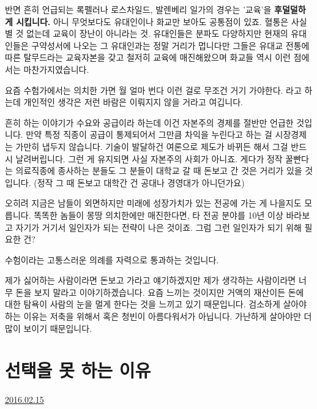 반면 흔히 언급되는 록펠러나 로스차일드, 발렌베리 일가의 경우는 '교육'을 \textbf{후덜덜하게 시킵니다.}
아니 무엇보다도 유대인이나 화교만 보아도 공통점이 있죠. 혈통은 사실 별 것 없는데 교육이 장난이 아니라는 것.
유대인들은 분파도 다양하지만 현재의 유대인들은 구약성서에 나오는 그 유대인과는 정말 거리가 멉니다만
그들은 유대교 전통에 따른 탈무드라는 교육자본을 갖고 철저히 교육에 매진해왔으며
화교들 역시 이런 점에서는 마찬가지였습니다.
\vspace{5mm}

요즘 수험가에서는 의치한 가면 월 얼마 번다 이런 걸로 무조건 거기 가야한다.
라고 하는데 개인적인 생각은 저런 바람은 이뤄지지 않을 거라고 여깁니다.
\vspace{5mm}

흔히 하는 이야기가 수요와 공급이라 하는데 이건 자본주의 경제를 절반만 언급한 것입니다.
만약 특정 직종이 공급이 통제되어서 그만큼 차익을 누린다고 하는 걸 시장경제는 가만히 냅두지 않습니다.
기술이 발달하건 여론으로 제도가 바뀌든 해서 그걸 반드시 날려버립니다. 그런 게 유지되면 사실 자본주의 사회가 아니죠.
게다가 정작 꿀빤다는 의료직종에 종사하는 분들도 그 분들이 대학교 갈 때 돈보고 간 것은 거리가 있을 것입니다.
(정작 그 때 돈보고 대학간 건 공대나 경영대가 아니던가요)
\vspace{5mm}

오히려 지금은 남들이 외면하지만 미래에 성장가치가 있는 전공에 가는 게 나을지도 모릅니다.
똑똑한 놈들이 몽땅 의치한에만 매진한다면, 타 전공 분야를 10년 이상 바라보고 자기가 거기서 일인자가 되는 전략이 나은 것이죠.
그럼 그런 일인자가 되기 위해 필요한 건?
\vspace{5mm}

수험이라는 고통스러운 의례를 자력으로 통과하는 것입니다.
\vspace{5mm}

제가 싫어하는 사람이라면 돈보고 가라고 얘기하겠지만
제가 생각하는 사람이라면 너무 돈을 보지 말라고 이야기하겠습니다.
요즘 느끼는 것이지만 거액의 재산이든 돈에 대한 탐욕이 사람의 눈을 멀게 한다는 것을 느끼고 있기 때문입니다.
검소하게 살아야하는 이유는 저축을 위해서 혹은 청빈이 아름다워서가 아닙니다.
가난하게 살아야만 더 많이 보이기 때문입니다.
\vspace{5mm}









\section{선택을 못 하는 이유}
\href{https://www.kockoc.com/Apoc/636857}{2016.02.15}

